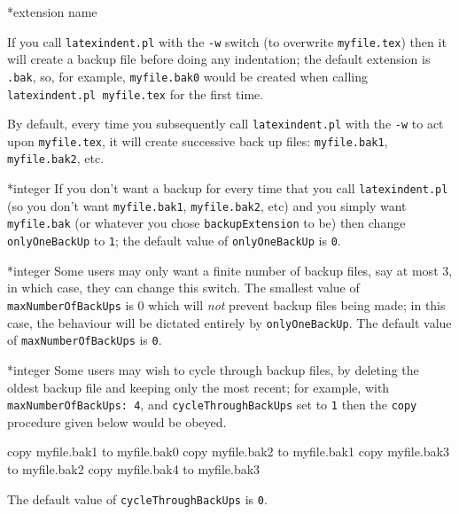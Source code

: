 *{extension name}

	If you call \texttt{latexindent.pl} with the \texttt{-w} switch (to overwrite
	\texttt{myfile.tex}) then it will create a backup file before doing
	any indentation; the default extension is \texttt{.bak}, so, for example, \texttt{myfile.bak0}
	would be created when calling \texttt{latexindent.pl myfile.tex}  for the first time.

	By default, every time you subsequently call \texttt{latexindent.pl} with
	the \texttt{-w} to act upon \texttt{myfile.tex}, it will create successive back up files: \texttt{myfile.bak1}, \texttt{myfile.bak2},
	etc.

*{integer}
	\label{page:onlyonebackup}
	If you don't want a backup for every time that you call \texttt{latexindent.pl} (so
	you don't want \texttt{myfile.bak1}, \texttt{myfile.bak2}, etc) and you simply
	want \texttt{myfile.bak} (or whatever you chose \texttt{backupExtension} to be)
	then change \texttt{onlyOneBackUp} to \texttt{1}; the default value of
	\texttt{onlyOneBackUp} is \texttt{0}.

*{integer}
	Some users may only want a finite number of backup files,
	say at most $3$, in which case, they can change this switch.
	The smallest value of \texttt{maxNumberOfBackUps} is $0$ which will \emph{not}
	prevent backup files being made; in this case, the behaviour will be dictated
	entirely by \texttt{onlyOneBackUp}. The default value of \texttt{maxNumberOfBackUps}
	is \texttt{0}.

*{integer}
	Some users may wish to cycle through backup files, by deleting the
	oldest backup file and keeping only the most recent; for example,
	with \texttt{maxNumberOfBackUps: 4}, and \texttt{cycleThroughBackUps}
	set to \texttt{1}  then the \texttt{copy} procedure given below
	would be obeyed.

	\begin{commandshell}
copy myfile.bak1 to myfile.bak0
copy myfile.bak2 to myfile.bak1
copy myfile.bak3 to myfile.bak2
copy myfile.bak4 to myfile.bak3
	\end{commandshell}
	The default value of \texttt{cycleThroughBackUps} is \texttt{0}.

